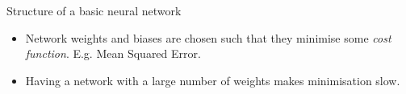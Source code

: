 \documentclass{beamer}
\begin{document}
\begin{frame}{Structure of a basic neural network}
\begin{figure}[t]
\begin{tikzpicture}[shorten >=1pt,->,draw=black!50, node distance=\layersep]
\end{tikzpicture}
\end{figure}
\pause
\begin{itemize}
\item Network weights and biases are chosen such that they minimise some \textit{cost function}. E.g. Mean Squared Error.
\item Having a network with a large number of weights makes minimisation slow.
\end{itemize}
\end{frame}




\end{document}
